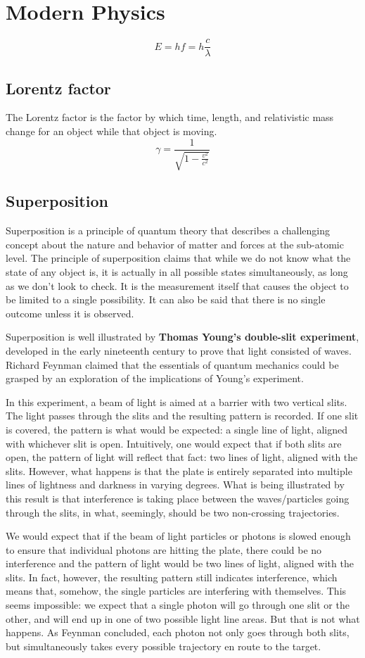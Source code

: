 \documentclass[oneside]{book}
\newcommand*\reciprocal[1]{\frac{1}{#1}}
\begin{document}
\chapter{Modern Physics}
\[E = hf = h\frac{c}{\lambda}\]

\section{Lorentz factor}
The Lorentz factor is the factor by which time, length, and relativistic mass
change for an object while that object is moving.
\[\gamma = \reciprocal{\sqrt{1 - \frac{v^2}{c^2}}}\]

\section{Superposition}
Superposition is a principle of quantum theory that describes a challenging
concept about the nature and behavior of matter and forces at the sub-atomic
level. The principle of superposition claims that while we do not know what the
state of any object is, it is actually in all possible states simultaneously,
as long as we don't look to check. It is the measurement itself that causes the
object to be limited to a single possibility. It can also be said that there is
no single outcome unless it is observed.

Superposition is well illustrated by \textbf{Thomas Young's double-slit
experiment}, developed in the early nineteenth century to prove that light
consisted of waves. Richard Feynman claimed that the essentials of quantum
mechanics could be grasped by an exploration of the implications of Young's
experiment.

In this experiment, a beam of light is aimed at a barrier with two vertical
slits.  The light passes through the slits and the resulting pattern is
recorded.  If one slit is covered, the pattern is what would be expected: a
single line of light, aligned with whichever slit is open. Intuitively, one
would expect that if both slits are open, the pattern of light will reflect
that fact: two lines of light, aligned with the slits.  However, what happens
is that the plate is entirely separated into multiple lines of lightness and
darkness in varying degrees.  What is being illustrated by this result is that
interference is taking place between the waves/particles going through the
slits, in what, seemingly, should be two non-crossing trajectories.

We would expect that if the beam of light particles or photons is slowed enough
to ensure that individual photons are hitting the plate, there could be no
interference and the pattern of light would be two lines of light, aligned with
the slits. In fact, however, the resulting pattern still indicates
interference, which means that, somehow, the single particles are interfering
with themselves. This seems impossible: we expect that a single photon will go
through one slit or the other, and will end up in one of two possible light
line areas. But that is not what happens. As Feynman concluded, each photon not
only goes through both slits, but simultaneously takes every possible
trajectory en route to the target.
\end{document}
